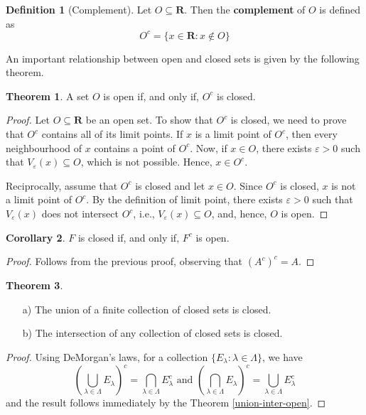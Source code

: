\documentclass[12pt,a4paper]{article}
\theoremstyle{definition}
\newtheorem{theorem}{Theorem}[section]
\newtheorem{corollary}[theorem]{Corollary}
\newtheorem{definition}{Definition}[section]
\begin{document}
\begin{definition}[Complement]
	Let $O \subseteq \textbf{R}$. Then the \textbf{complement} of $O$ is defined as
	\[
		O^c = \{ x \in \textbf{R} : x \notin O \}
	\]
\end{definition}

An important relationship between open and closed sets is given by the following theorem.

\begin{theorem}
	A set $O$ is open if, and only if, $O^c$ is closed.
\end{theorem}

\begin{proof}
	Let $O \subseteq \textbf{R}$ be an open set. To show that $O^c$ is closed, we need to prove that $O^c$ contains all of its limit points. If $x$ is a limit point of $O^c$, then every neighbourhood of $x$ contains a point of $O^c$. Now, if $x \in O$, there exists $\varepsilon > 0$ such that $V_{\varepsilon}(x) \subseteq O$, which is not possible. Hence, $x \in O^c$.
	
	Reciprocally, assume that $O^c$ is closed and let $x \in O$. Since $O^c$ is closed, $x$ is not a limit point of $O^c$. By the definition of limit point, there exists $\varepsilon > 0$ such that $V_{\varepsilon}(x)$ does not intersect $O^c$, i.e., $V_{\varepsilon}(x) \subseteq O$, and, hence, $O$ is open.
\end{proof}

\begin{corollary}
	$F$ is closed if, and only if, $F^c$ is open.
\end{corollary}

\begin{proof}
	Follows from the previous proof, observing that $(A^c)^c = A$.
\end{proof}

\begin{theorem}\label{union-inter-closed}
	\begin{itemize} \hfill
		\item[a)] The union of a finite collection of closed sets is closed.
		\item[b)] The intersection of any collection of closed sets is closed.
	\end{itemize}
\end{theorem}

\begin{proof}
	Using DeMorgan's laws, for a collection $\{ E_{\lambda} : \lambda \in \Lambda\}$, we have
	\[
		\left( \bigcup_{\lambda \in \Lambda} E_\lambda \right)^c = \bigcap_{\lambda \in \Lambda} E_\lambda^c \text{ and } \left( \bigcap_{\lambda \in \Lambda} E_\lambda \right)^c = \bigcup_{\lambda \in \Lambda} E_\lambda^c
	\]
	and the result follows immediately by the Theorem \ref{union-inter-open}.
\end{proof}
\end{document}
